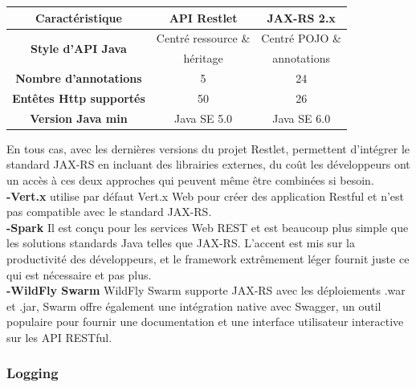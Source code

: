 \documentclass[12pt, a4paper, openany]{report}
\begin{document}
   \begin{center}
   \begin{tabular}{|c|c|c|}
    \hline
    
    \rowcolor[rgb]{0.5,0.5,0}\textbf{Caractéristique}&\textbf{API Restlet}&\textbf{JAX-RS 2.x} \\ \hline
    
     \multirow{2}{*}{\textbf{Style d'API Java}} & Centré ressource \& & Centré POJO \& \\  
                                                & héritage  & annotations \\ \hline
     
     \textbf{Nombre d'annotations} &  5 & 24 \\ \hline
     
     \textbf{Entêtes Http supportés} & 50 & 26 \\ \hline
     
     \textbf{Version Java min} & Java SE 5.0 & Java SE 6.0 \\ \hline
     
   \end{tabular}
   \label{tab6}
   \end{center}
   
   En tous cas, avec les dernières versions du projet Restlet, permettent d’intégrer le standard JAX-RS en incluant des librairies externes, du coût les développeurs ont un accès à ces deux approches qui peuvent même être combinées si besoin.\\
   
   \textbf{-Vert.x} utilise par défaut Vert.x Web pour créer des application Restful et n'est pas compatible avec le standard JAX-RS. \\
   
   \textbf{-Spark} Il est conçu pour les services Web REST et est beaucoup plus simple que les solutions standards Java telles que JAX-RS. L'accent est mis sur la productivité des développeurs, et le framework extrêmement léger fournit juste ce qui est nécessaire et pas plus.\\
   
   \textbf{-WildFly Swarm} WildFly Swarm supporte JAX-RS avec les déploiements .war et .jar, Swarm offre également une intégration native avec Swagger, un outil populaire pour fournir une documentation et une interface utilisateur interactive sur les API RESTful.\\
   
   \subsubsection{Logging}
   
\end{document}
